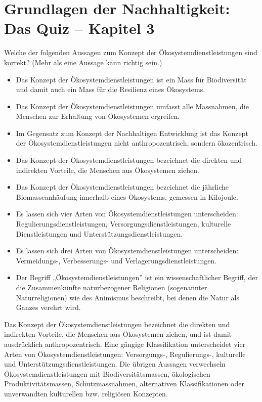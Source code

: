 \documentclass[
  nswissgerman,
  a4paper,
  DIV=11,
  numbers=noendperiod,
  oneside,
  openany]{scrreprt}
\providecommand{\tightlist}{%
  \setlength{\itemsep}{0pt}\setlength{\parskip}{0pt}}
\begin{document}
\section{Grundlagen der Nachhaltigkeit: Das Quiz -- Kapitel
3}\label{grundlagen-der-nachhaltigkeit-das-quiz-kapitel-3}

Welche der folgenden Aussagen zum Konzept der Ökosystemdienstleistungen
sind korrekt? (Mehr als eine Aussage kann richtig sein.)

\begin{itemize}
\tightlist
\item[$\square$]
  Das Konzept der Ökosystemdienstleistungen ist ein Mass für
  Biodiversität und damit auch ein Mass für die Resilienz eines
  Ökosystems.
\item[$\square$]
  Das Konzept der Ökosystemdienstleistungen umfasst alle Massnahmen, die
  Menschen zur Erhaltung von Ökosystemen ergreifen.
\item[$\square$]
  Im Gegensatz zum Konzept der Nachhaltigen Entwicklung ist das Konzept
  der Ökosystemdienstleistungen nicht anthropozentrisch, sondern
  ökozentrisch.
\item[$\square$]
  Das Konzept der Ökosystemdienstleistungen bezeichnet die direkten und
  indirekten Vorteile, die Menschen aus Ökosystemen ziehen.
\item[$\square$]
  Das Konzept der Ökosystemdienstleistungen bezeichnet die jährliche
  Biomasseanhäufung innerhalb eines Ökosystems, gemessen in Kilojoule.
\item[$\square$]
  Es lassen sich vier Arten von Ökosystemdienstleistungen unterscheiden:
  Regulierungsdienstleistungen, Versorgungsdienstleistungen, kulturelle
  Dienstleistungen und Unterstützungsdienstleistungen.
\item[$\square$]
  Es lassen sich drei Arten von Ökosystemdienstleistungen unterscheiden:
  Vermeidungs-, Verbesserungs- und Verlagerungsdienstleistungen.
\item[$\square$]
  Der Begriff „Ökosystemdienstleistungen'' ist ein wissenschaftlicher
  Begriff, der die Zusammenkünfte naturbezogener Religionen (sogenannter
  Naturreligionen) wie des Animismus beschreibt, bei denen die Natur als
  Ganzes verehrt wird.
\end{itemize}

Das Konzept der Ökosystemdienstleistungen bezeichnet die direkten und
indirekten Vorteile, die Menschen aus Ökosystemen ziehen, und ist damit
ausdrücklich anthropozentrisch. Eine gängige Klassifikation
unterscheidet vier Arten von Ökosystemdienstleistungen: Versorgungs-,
Regulierungs-, kulturelle und Unterstützungsdienstleistungen. Die
übrigen Aussagen verwechseln Ökosystemdienstleistungen mit
Biodiversitätsmassen, ökologischen Produktivitätsmassen,
Schutzmassnahmen, alternativen Klassifikationen oder unverwandten
kulturellen bzw. religiösen Konzepten.
\end{document}
